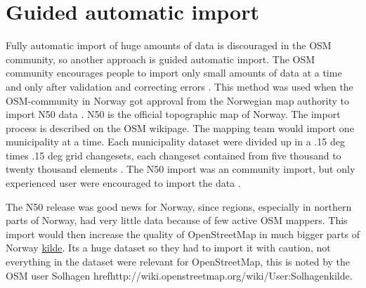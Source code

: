 



\section{Guided automatic import}\label{guidedautoimp}
Fully automatic import of huge amounts of data is discouraged in the OSM community, so another approach is guided automatic import. The OSM community encourages people to import only small amounts of data at a time and only after validation and correcting errors \cite{Mehus2014}. This method was used when the OSM-community in Norway got approval from the Norwegian map authority to import N50 data \cite{Kihle2014}. N50 is the official topographic map of Norway. The import process is described on the OSM wikipage. The mapping team would import one municipality at a time. Each municipality dataset were divided up in a .15 deg times .15 deg grid changesets, each changeset contained from five thousand to twenty thousand elements \cite{OSMN502014}. The N50 import was an community import, but only experienced user were encouraged to import the data \cite{Mehus2014}. 

The N50 release was good news for Norway, since regions, especially in northern parts of Norway, had very little data because of few active OSM mappers. This import would then increase the quality of OpenStreetMap in much bigger parts of Norway \href{http://www.digi.no/artikler/kartskatt-til-alle/286539}{kilde}. Its a huge dataset so they had to import it with caution, not everything in the dataset were relevant for OpenStreetMap, this is noted by the OSM user Solhagen href{http://wiki.openstreetmap.org/wiki/User:Solhagen}{kilde}. %

